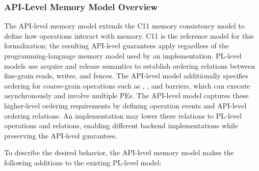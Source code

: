 \subsubsection{API-Level Memory Model Overview}\label{subsubsec:api_model_overview}

The \openshmem API-level memory model extends the C11 memory consistency model to define
    how \openshmem operations interact with memory. C11 is the reference model for this
    formalization; the resulting API-level guarantees apply regardless of the
    programming-language memory model used by an implementation. PL-level models use
    acquire and release semantics to establish ordering relations between fine-grain
    reads, writes, and fences. The API-level model additionally specifies ordering for
    coarse-grain operations such as \GET{}, \PUT{}, and barriers, which can execute
    asynchronously and involve multiple \acp{PE}.
The API-level model captures these higher-level ordering requirements by defining
    operation events and API-level ordering relations. An implementation may lower these
    relations to PL-level operations and relations, enabling different backend
    implementations while preserving the API-level guarantees.

To describe the desired \openshmem behavior, the API-level memory model makes the
    following additions to the existing PL-level model:

